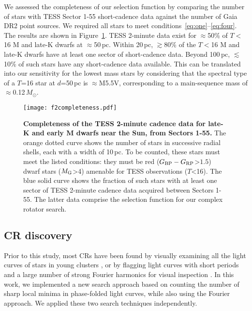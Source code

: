 \documentclass[11pt,twocolumn,tighten]{aastex63}
\newcommand{\bprp}{G_{\rm BP} - G_{\rm RP}}
\begin{document}
We assessed the completeness of our selection function by comparing
the number of stars with TESS Sector 1-55 short-cadence data against
the number of Gaia DR2 point sources.
We required all stars to meet conditions~\ref{eq:one}--\ref{eq:four}.
The results are shown in Figure~\ref{fig:completeness}.
TESS 2-minute data exist for $\approx$50\%
of $T$$<$16 M and late-K dwarfs at $\approx$50\,pc.
Within 20\,pc, $\gtrsim$80\% of the $T$$<$16 M and late-K dwarfs have
at least one sector of short-cadence data.
Beyond 100\,pc, $\lesssim$10\% of such stars have any short-cadence
data available.
This can be translated into our sensitivity for the lowest mass stars
by considering that the spectral type of a $T$=16 star at $d$=50\,pc
is $\approx$M5.5V, corresponding to a main-sequence mass of
$\approx$0.12\,$M_\odot$.

\begin{figure}[!tp]
	\begin{center}
		\centering
		\texttt{[image: f2completeness.pdf]}
		\vspace{-0.5cm}
		\caption{
			{\bf Completeness of the TESS 2-minute cadence data for late-K
      and early M dwarfs near the Sun, from Sectors 1-55.}  
      The orange dotted curve shows the number of stars in successive
      radial shells, each with a width of 10\,pc.  To be counted,
      these stars must meet the listed conditions: they must be red
      ($\bprp$>$1.5$) dwarf stars ($M_{\rm G}$>4) amenable for TESS
      observations ($T$<16).  The blue solid curve shows the fraction
      of such stars with at least one sector of TESS 2-minute cadence
      data acquired between Sectors 1-55.  The latter data comprise
      the selection function for our complex rotator search.
		}
			\vspace{-0.5cm}
		\label{fig:completeness}
	\end{center}
\end{figure}



\subsection{CR discovery}
\label{subsec:discoverymethods}

Prior to this study, most CRs have been found by visually examining
all the light curves of stars in young clusters
\citep{2016AJ....152..114R,2017AJ....153..152S,2023ApJ...945..114P},
or by flagging light curves with short periods and a large number of
strong Fourier harmonics for visual inspection
\citep{2019ApJ...876..127Z}.  In this work, we implemented a new
search approach based on counting the number of sharp local minima in
phase-folded light curves, while also using the Fourier approach.  We
applied these two search techniques independently.
\end{document}
